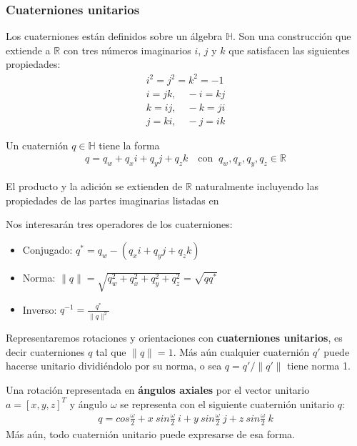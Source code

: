 \documentclass[ twoside,openright,titlepage,numbers=noenddot,%
                headinclude,footinclude,cleardoublepage=empty,abstract=on,
                BCOR=-5mm,paper=a4,fontsize=11pt
                ]{scrreprt}
\newcommand{\R}{\mathbb{R}}
\renewcommand{\H}{\mathbb{H}}
\begin{document}
\hypertarget{cuaterniones-unitarios}{%
\subsubsection{Cuaterniones unitarios}\label{cuaterniones-unitarios}}

Los cuaterniones están definidos sobre un álgebra \(\H\). Son una
construcción que extiende a \(\R\) con tres números imaginarios \(i\),
\(j\) y \(k\) que satisfacen las siguientes propiedades: \begin{align}
i^2 = j^2 = k^2 = -1 \label{eq:quat-imaginary-props-start} \\
i = jk, \quad -i = kj \\
k = ij, \quad -k = ji \\
j = ki, \quad -j = ik \label{eq:quat-imaginary-props-end}
\end{align}

Un cuaternión \(q \in \H\) tiene la forma \begin{align}
q = q_w + q_x i + q_y j + q_z k \quad \text{con }\  q_w, q_x, q_y, q_z \in \R
\end{align}

El producto y la adición se extienden de \(\R\) naturalmente incluyendo
las propiedades de las partes imaginarias listadas en

Nos interesarán tres operadores de los cuaterniones:

\bigbreak

\begin{itemize}
\item
  Conjugado: \(q^* = q_w - (q_x i + q_y j + q_z k)\)
\item
  Norma:
  \(\| q \| = \sqrt{q_w ^2 + q_x^2 + q_y^2 + q_z^2} = \sqrt{qq^*}\)
\item
  Inverso: \(q^{-1} = \frac{q^*}{\|q\|^2}\)
\end{itemize}

\bigbreak

Representaremos rotaciones y orientaciones con \textbf{cuaterniones
unitarios}, es decir cuaterniones \(q\) tal que \(\| q \| = 1\). Más aún
cualquier cuaternión \(q'\) puede hacerse unitario dividiéndolo por su
norma, o sea \(q = q' / \|q'\|\) tiene norma 1.

Una rotación representada en \textbf{ángulos axiales} por el vector
unitario \(a = [x, y, z]^T\) y ángulo \(\omega\) se representa con el
siguiente cuaternión unitario \(q\): \begin{align}
q = cos\frac{\omega}{2} + x\ sin\frac{\omega}{2}\ i + y\ sin\frac{\omega}{2}\ j + z\ sin\frac{\omega}{2}\ k
\end{align} Más aún, todo cuaternión unitario puede expresarse de esa
forma.
\end{document}

